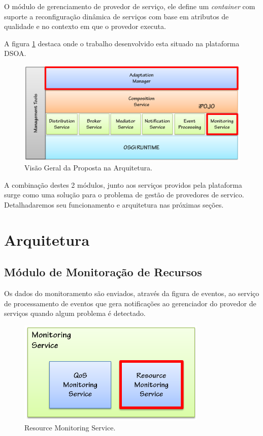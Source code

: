O módulo de gerenciamento de provedor de serviço, ele define um \textit{container} com suporte a reconfiguração dinâmica de serviços com base em atributos de qualidade e no contexto em que o provedor executa.

A figura \ref{fig:proposal} destaca onde o trabalho desenvolvido esta situado na plataforma DSOA.

\begin{figure}[htp]
\centering
\includegraphics[width=13cm]{chapters/chapter4/dsoa-provider-manager.png}
\caption[Visão Geral da Proposta na Arquitetura]{Visão Geral da Proposta na Arquitetura.}
\label{fig:proposal}
\end{figure}

A combinação destes 2 módulos, junto aos serviços providos pela plataforma surge como uma solução para o problema de gestão de provedores de servico. Detalhadaremos seu funcionamento e arquitetura nas próximas seções.

\section{Arquitetura}


\subsection{Módulo de Monitoração de Recursos}

Os dados do monitoramento são enviados, através da figura de eventos, ao serviço de processamento de eventos que gera notificações ao gerenciador do provedor de serviços quando algum problema é detectado.%

\begin{figure}[htp]
\centering
\includegraphics[width=9cm]{chapters/chapter4/monitoring-service.png}
\caption[Resource Monitoring Service]{Resource Monitoring Service.}
\label{fig:resc_module}
\end{figure}



